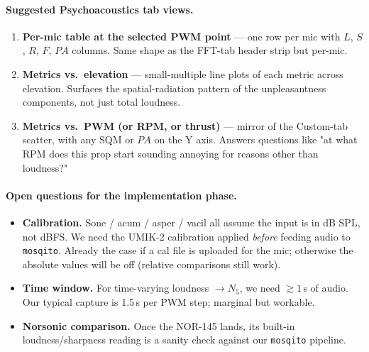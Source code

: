 \documentclass[11pt,a4paper]{article}
\begin{document}
\paragraph{Suggested Psychoacoustics tab views.}
\begin{enumerate}
  \item \textbf{Per-mic table at the selected PWM point} --- one row per mic with
        $L$, $S$, $R$, $F$, $PA$ columns. Same shape as the FFT-tab header strip
        but per-mic.
  \item \textbf{Metrics vs.\ elevation} --- small-multiple line plots of each metric
        across elevation. Surfaces the spatial-radiation pattern of the unpleasantness
        components, not just total loudness.
  \item \textbf{Metrics vs.\ PWM (or RPM, or thrust)} --- mirror of the Custom-tab
        scatter, with any SQM or $PA$ on the Y axis. Answers questions like
        "at what RPM does this prop start sounding annoying for reasons other
        than loudness?"
\end{enumerate}

\paragraph{Open questions for the implementation phase.}
\begin{itemize}
  \item \textbf{Calibration.} Sone / acum / asper / vacil all assume the input is
        in dB SPL, not dBFS. We need the UMIK-2 calibration applied \emph{before}
        feeding audio to \texttt{mosqito}. Already the case if a cal file is
        uploaded for the mic; otherwise the absolute values will be off (relative
        comparisons still work).
  \item \textbf{Time window.} For time-varying loudness $\to N_5$, we need
        $\gtrsim 1$\,s of audio. Our typical capture is 1.5\,s per PWM step;
        marginal but workable.
  \item \textbf{Norsonic comparison.} Once the NOR-145 lands, its built-in
        loudness/sharpness reading is a sanity check against our \texttt{mosqito}
        pipeline.
\end{itemize}
\end{document}
